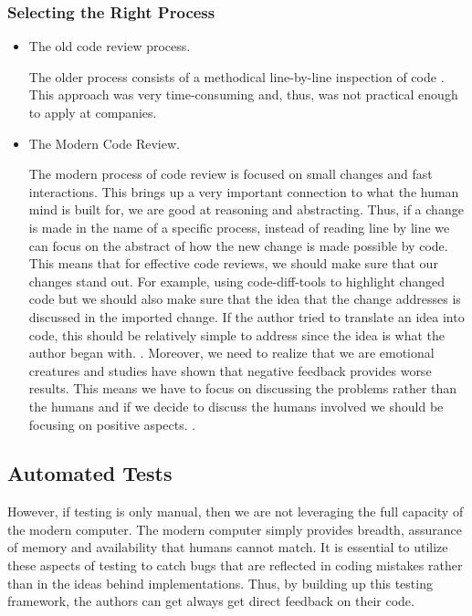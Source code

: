 \documentclass{article}
\begin{document}
\subsubsection{Selecting the Right Process}
\begin{itemize}
    \item The old code review process.

    The older process consists of a methodical line-by-line inspection of code \cite{cassee_silent_2020}. This approach
    was very time-consuming and, thus, was not practical enough to apply at companies.

    \item The Modern Code Review.

    The modern process of code review is focused on small changes and fast interactions. \cite{cassee_silent_2020} 
    This brings up a very important connection to what the human mind is built for, we are good at reasoning and abstracting. 
    Thus, if a change is made in the name of a specific process, instead of reading line by line we can focus on the abstract of how the new change is made possible by code. 
    This means that for effective code reviews, we should make sure that our changes stand out. 
    For example, using code-diff-tools to highlight changed code but we should also make sure that the idea that the change addresses is discussed in the imported change. 
    If the author tried to translate an idea into code, this should be relatively simple to address since the idea is what the author began with. \cite{sadowski_modern_2018}.
    Moreover, we need to realize that we are emotional creatures and studies have shown that negative feedback provides worse results. 
    This means we have to focus on discussing the problems rather than the humans and if we decide to discuss the humans involved we should be focusing on positive aspects. \cite{sadowski_modern_2018}.
\end{itemize}
\subsection{Automated Tests}

However, if testing is only manual, then we are not leveraging the full capacity of the modern computer. 
The modern computer simply provides breadth, assurance of memory and availability that humans cannot match. 
It is essential to utilize these aspects of testing to catch bugs that are reflected in coding mistakes rather than in the ideas behind implementations. 
Thus, by building up this testing framework, the authors can get always get direct feedback on their code.
\end{document}
